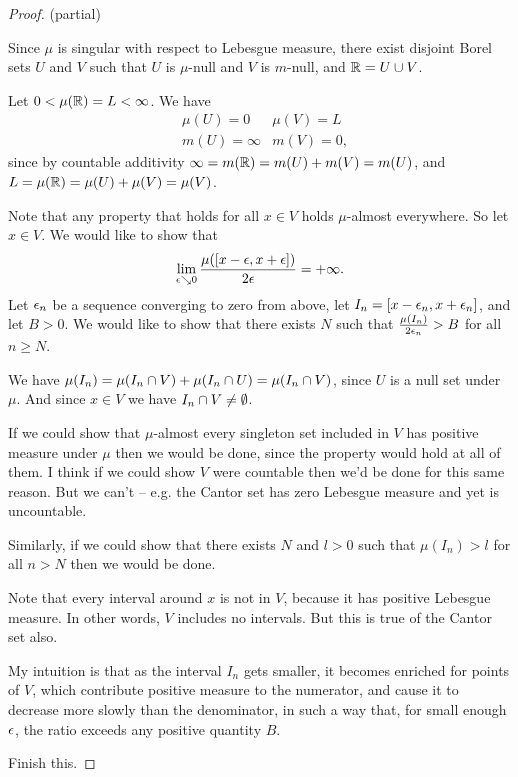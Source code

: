 \begin{proof}
   (partial)

  Since $\mu$ is singular with respect to Lebesgue measure, there exist disjoint Borel sets $U$ and $V$ such
  that $U$ is $\mu$-null and $V$ is $m$-null, and $\mathbb{R} = U \cup V$.

  Let $0 < \mu(\mathbb{R}) = L < \infty$. We have
  \begin{align*}
    &\mu(U) = 0     & \mu(V) = L \\
    &m(U) = \infty & m(V) = 0,
  \end{align*}
  since by countable additivity $\infty = m(\mathbb{R}) = m(U) + m(V) = m(U)$,
  and $L = \mu(\mathbb{R}) = \mu(U) + \mu(V) = \mu(V)$.

  Note that any property that holds for all $x \in V$ holds $\mu$-almost everywhere. So let $x \in V$. We would
  like to show that
  \begin{align*}
    \lim_{\eps \searrow 0} \frac{\mu([x - \eps, x + \eps])}{2\eps} = +\infty.
  \end{align*}
  Let $\epsilon_n$ be a sequence converging to zero from above, let $I_n = [x - \epsilon_n, x + \epsilon_n]$, and
  let $B > 0$. We would like to show that there exists $N$ such that $\frac{\mu(I_n)}{2\epsilon_n} > B$ for
  all $n \geq N$.

  We have $\mu(I_n) = \mu(I_n \cap V) + \mu(I_n \cap U) = \mu(I_n \cap V)$, since $U$ is a null set
  under $\mu$. And since $x \in V$ we have $I_n \cap V \neq \emptyset$.

  If we could show that $\mu$-almost every singleton set included in $V$ has positive measure under $\mu$ then
  we would be done, since the property would hold at all of them. I think if we could show $V$ were countable
  then we'd be done for this same reason. But we can't -- e.g. the Cantor set has zero Lebesgue measure and yet
  is uncountable.

  Similarly, if we could show that there exists $N$ and $l > 0$ such that $\mu(I_n) > l$ for all $n > N$ then
  we would be done.

  Note that every interval around $x$ is not in $V$, because it has positive Lebesgue measure. In other
  words, $V$ includes no intervals. But this is true of the Cantor set also.

  My intuition is that as the interval $I_n$ gets smaller, it becomes enriched for points of $V$, which
  contribute positive measure to the numerator, and cause it to decrease more slowly than the denominator, in
  such a way that, for small enough $\epsilon$, the ratio exceeds any positive quantity $B$.

   Finish this.
\end{proof}

